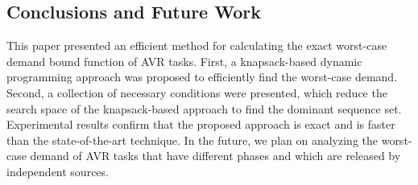 \subsection{Conclusions and Future Work}
\label{sec:conclusion}

This paper presented an efficient method for calculating the exact worst-case demand bound function of AVR tasks. First, a knapsack-based dynamic programming approach was proposed to efficiently find the worst-case demand. Second, a collection of necessary conditions were presented, which reduce the search space of the knapsack-based approach to find the dominant sequence set. Experimental results confirm that the proposed approach is exact and is faster than the state-of-the-art technique. In the future, we plan on analyzing the worst-case demand of AVR tasks that have different phases and which are released by independent sources.






